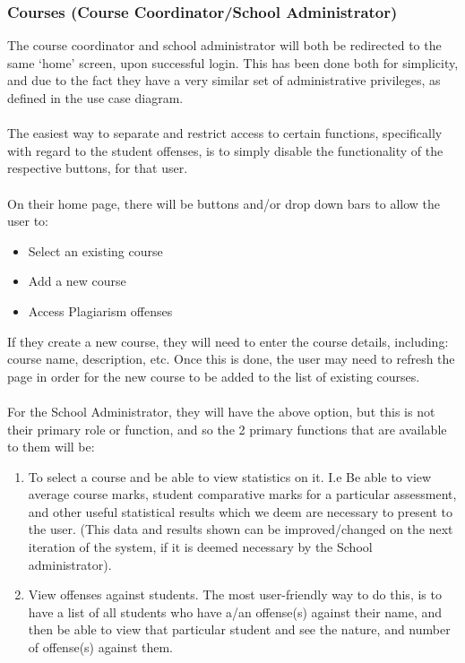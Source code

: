 \documentclass[paper=a4, fontsize=11pt]{scrartcl}
\numberwithin{equation}{section}		%
\numberwithin{figure}{section}			%
\numberwithin{table}{section}				%
\begin{document}
\subsubsection{Courses (Course Coordinator/School Administrator)}
The course coordinator and school administrator will both be redirected to the same ‘home’ screen, upon successful login. This has been done both for simplicity, and due to the fact they have a very similar set of administrative privileges, as defined in the use case diagram.\\\\The easiest way to separate and restrict access to certain functions, specifically with regard to the student offenses, is to simply disable the functionality of the respective buttons, for that user.\\\\On their home page, there will be buttons and/or drop down bars to allow the user to:
\begin{itemize}
\item Select an existing course
\item Add a new course
\item Access Plagiarism offenses
\end{itemize}
If they create a new course, they will need to enter the course details, including: course name, description, etc. Once this is done, the user may need to refresh the page in order for the new course to be added to the list of existing courses.\\\\For the School Administrator, they will have the above option, but this is not their primary role or function, and so the 2 primary functions that are available to them will be:
\begin{enumerate}
\item To select a course and be able to view statistics on it. I.e Be able to view average course marks, student comparative marks for a particular assessment, and other useful statistical results which we deem are necessary to present to the user. (This data and results shown can be improved/changed on the next iteration of the system, if it is deemed necessary by the School administrator).
\item View offenses against students. The most user-friendly way to do this, is to have a list of all students who have a/an offense(s) against their name, and then be able to view that particular student and see the nature, and number of offense(s) against them.
\end{enumerate}
\end{document}
